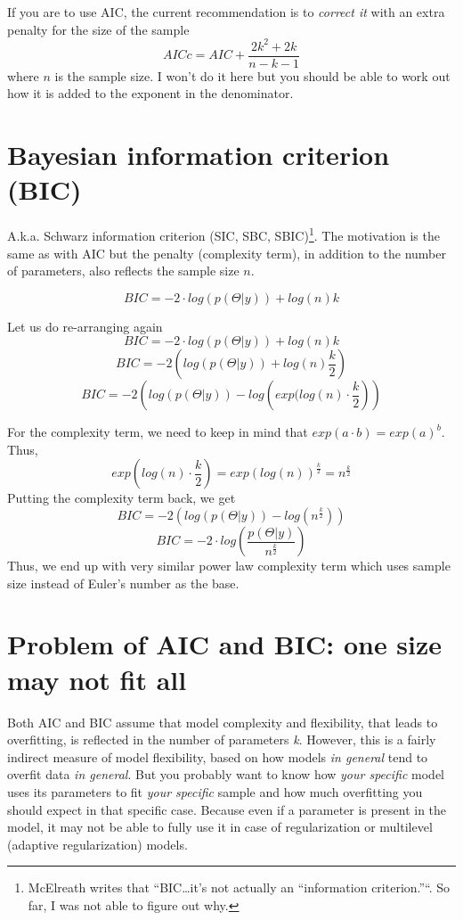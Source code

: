 \documentclass[
]{book}
\begin{document}
If you are to use AIC, the current recommendation is to \emph{correct it} with an extra penalty for the size of the sample
\[AICc = AIC + \frac{2k^2 + 2k}{n - k - 1}\]
where \(n\) is the sample size. I won't do it here but you should be able to work out how it is added to the exponent in the denominator.

\hypertarget{bayesian-information-criterion-bic}{%
\section{Bayesian information criterion (BIC)}\label{bayesian-information-criterion-bic}}

A.k.a. Schwarz information criterion (SIC, SBC, SBIC)\footnote{McElreath writes that ``BIC\ldots it's not actually an ``information criterion.''``. So far, I was not able to figure out why.}. The motivation is the same as with AIC but the penalty (complexity term), in addition to the number of parameters, also reflects the sample size \(n\).

\[BIC = -2\cdot log(p(\Theta|y)) + log(n) k \]

Let us do re-arranging again
\[BIC = -2\cdot log(p(\Theta|y)) + log(n) k \]
\[BIC = -2 \left( log(p(\Theta|y)) + log(n) \frac{k}{2} \right) \]
\[BIC = -2 \left( log(p(\Theta|y)) - log \left(exp(log(n) \cdot \frac{k}{2} \right) \right) \]

For the complexity term, we need to keep in mind that \(exp(a \cdot b) = exp(a)^b\). Thus,
\[exp \left(log(n) \cdot \frac{k}{2} \right)= exp(log(n)) ^ \frac{k}{2} = n^\frac{k}{2}\]
Putting the complexity term back, we get
\[BIC = -2 \left( log(p(\Theta|y)) - log \left(n^\frac{k}{2} \right) \right)\]
\[BIC = -2 \cdot log \left(\frac{p(\Theta|y)}{n^\frac{k}{2}} \right)\]
Thus, we end up with very similar power law complexity term which uses sample size instead of Euler's number as the base.

\hypertarget{problem-of-aic-and-bic-one-size-may-not-fit-all}{%
\section{Problem of AIC and BIC: one size may not fit all}\label{problem-of-aic-and-bic-one-size-may-not-fit-all}}

Both AIC and BIC assume that model complexity and flexibility, that leads to overfitting, is reflected in the number of parameters \emph{k}. However, this is a fairly indirect measure of model flexibility, based on how models \emph{in general} tend to overfit data \emph{in general}. But you probably want to know how \emph{your specific} model uses its parameters to fit \emph{your specific} sample and how much overfitting you should expect in that specific case. Because even if a parameter is present in the model, it may not be able to fully use it in case of regularization or multilevel (adaptive regularization) models.
\end{document}
